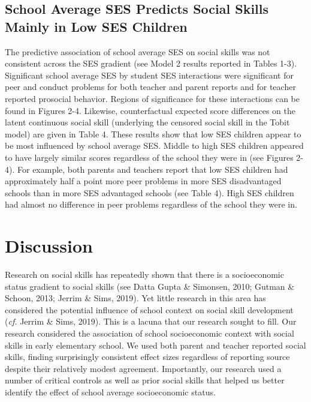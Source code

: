 \documentclass[
  english,
  man]{apa6}
\begin{document}
\hypertarget{school-average-ses-predicts-social-skills-mainly-in-low-ses-children}{%
\subsection{School Average SES Predicts Social Skills Mainly in Low SES Children}\label{school-average-ses-predicts-social-skills-mainly-in-low-ses-children}}

The predictive association of school average SES on social skills was not consistent across the SES gradient (see Model 2 results reported in Tables 1-3). Significant school average SES by student SES interactions were significant for peer and conduct problems for both teacher and parent reports and for teacher reported prosocial behavior. Regions of significance for these interactions can be found in Figures 2-4. Likewise, counterfactual expected score differences on the latent continuous social skill (underlying the censored social skill in the Tobit model) are given in Table 4. These results show that low SES children appear to be most influenced by school average SES. Middle to high SES children appeared to have largely similar scores regardless of the school they were in (see Figures 2-4). For example, both parents and teachers report that low SES children had approximately half a point more peer problems in more SES disadvantaged schools than in more SES advantaged schools (see Table 4). High SES children had almost no difference in peer problems regardless of the school they were in.

\hypertarget{discussion}{%
\section{Discussion}\label{discussion}}

Research on social skills has repeatedly shown that there is a socioeconomic status gradient to social skills (see Datta Gupta \& Simonsen, 2010; Gutman \& Schoon, 2013; Jerrim \& Sims, 2019). Yet little research in this area has considered the potential influence of school context on social skill development (\emph{cf.} Jerrim \& Sims, 2019). This is a lacuna that our research sought to fill. Our research considered the association of school socioeconomic context with social skills in early elementary school. We used both parent and teacher reported social skills, finding surprisingly consistent effect sizes regardless of reporting source despite their relatively modest agreement. Importantly, our research used a number of critical controls as well as prior social skills that helped us better identify the effect of school average socioeconomic status.
\end{document}

